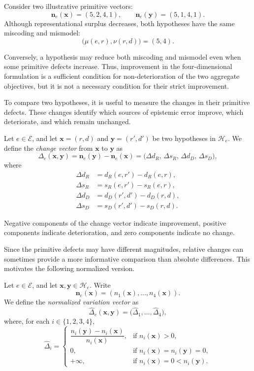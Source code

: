 \begin{example}
Consider two illustrative primitive vectors:
\[
\mathbf n_e(\mathbf{x})=(5,2,4,1), \qquad \mathbf n_e(\mathbf{y})=(5,1,4,1).
\]
Although representational surplus decreases, both
hypotheses have the same miscoding and mismodel:
\[
\bigl(\mu(e,r),\nu(r,d)\bigr)=(5,4).
\]
\end{example}

Conversely, a hypothesis may reduce both miscoding and mismodel even when some primitive defects increase. Thus, improvement in the four-dimensional formulation is a sufficient condition for non-deterioration of the two aggregate objectives, but it is not a necessary condition for their strict improvement.

To compare two hypotheses, it is useful to measure the changes in their primitive defects. These changes identify which sources of epistemic error improve, which deteriorate, and which remain unchanged.

\begin{definition}
Let $e\in\mathcal E$, and let $\mathbf{x}=(r,d)$ and $\mathbf{y}=(r',d')$ be two hypotheses in $\mathcal H_e$. We define the \emph{change vector} from $\mathbf{x}$ to $\mathbf{y}$ as
\[
\Delta_e(\mathbf{x},\mathbf{y}) = \mathbf n_e(\mathbf{y})-\mathbf n_e(\mathbf{x}) =
\bigl(\Delta d_R,\, \Delta s_R,\, \Delta d_D,\, \Delta s_D \bigr),
\]
where
\begin{align*}
\Delta d_R
&=d_R(e,r')-d_R(e,r),\\
\Delta s_R
&=s_R(e,r')-s_R(e,r),\\
\Delta d_D
&=d_D(r',d')-d_D(r,d),\\
\Delta s_D
&=s_D(r',d')-s_D(r,d).
\end{align*}
\end{definition}

Negative components of the change vector indicate improvement, positive components indicate deterioration, and zero components indicate no change.

Since the primitive defects may have different magnitudes, relative changes can sometimes provide a more informative comparison than absolute differences. This motivates the following normalized version.

\begin{definition}
Let $e\in\mathcal E$, and let $\mathbf{x},\mathbf{y}\in\mathcal H_e$. Write
\[
\mathbf n_e(\mathbf{x}) = (n_1(\mathbf{x}),\ldots,n_4(\mathbf{x})).
\]
We define the \emph{normalized variation vector}  as
\[
\widehat{\Delta}_e(\mathbf{x},\mathbf{y}) =
\bigl(\widehat{\Delta}_1,\ldots, \widehat{\Delta}_4 \bigr),
\]
where, for each $i\in\{1,2,3,4\}$,
\[
\widehat{\Delta}_i =
\begin{cases}
\dfrac{n_i(\mathbf{y})-n_i(\mathbf{x})}
      {n_i(\mathbf{x})},
&\text{if }n_i(\mathbf{x})>0,\\[1.2ex] 0,
&\text{if }n_i(\mathbf{x})=n_i(\mathbf{y})=0,\\[0.8ex] +\infty,
&\text{if }n_i(\mathbf{x})=0<n_i(\mathbf{y}).
\end{cases}
\]
\end{definition}

